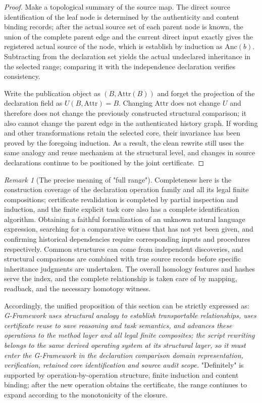 \documentclass[11pt,a4paper]{article}
\theoremstyle{plain}
\theoremstyle{definition}
\theoremstyle{remark}
\newtheorem{remark}[theorem]{Remark}
\begin{document}
\begin{CJK*}
\begin{proof}
Make a topological summary of the source map. The direct source identification of the leaf node is determined by the authenticity and content binding records; after the actual source set of each parent node is known, the union of the complete parent edge and the current direct input exactly gives the registered actual source of the node, which is establish by induction as $\mathrm{Anc}(b)$. Subtracting from the declaration set yields the actual undeclared inheritance in the selected range; comparing it with the independence declaration verifies consistency.

Write the publication object as $(B,\mathrm{Attr}(B))$ and forget the projection of the declaration field as $U(B,\mathrm{Attr})=B$. Changing $\mathrm{Attr}$ does not change $U$ and therefore does not change the previously constructed structural comparison; it also cannot change the parent edge in the authenticated history graph. If wording and other transformations retain the selected core, their invariance has been proved by the foregoing induction. As a result, the clean rewrite still uses the same analogy and reuse mechanism at the structural level, and changes in source declarations continue to be positioned by the joint certificate.\end{proof}


\begin{remark}
[The precise meaning of "full range"]Completeness here is the construction coverage of the declaration operation family and all its legal finite compositions; certificate revalidation is completed by partial inspection and induction, and the finite explicit task core also has a complete identification algorithm. Obtaining a faithful formalization of an unknown natural language expression, searching for a comparative witness that has not yet been given, and confirming historical dependencies require corresponding inputs and procedures respectively. Common structures can come from independent discoveries, and structural comparisons are combined with true source records before specific inheritance judgments are undertaken. The overall homology features and hashes serve the index, and the complete relationship is taken care of by mapping, readback, and the necessary homotopy witness.\end{remark}


Accordingly, the unified proposition of this section can be strictly expressed as: \emph { G-Framework uses structural analogy to establish transportable relationships, uses certificate reuse to save reasoning and task semantics, and advances these operations to the method layer and all legal finite composites; the script rewriting belongs to the same derived operating system at its structural layer, so it must enter the G-Framework in the declaration comparison domain representation, verification, retained core identification and source audit scope. } "Definitely" is supported by operation-by-operation structure, finite induction and content binding; after the new operation obtains the certificate, the range continues to expand according to the monotonicity of the closure.




\end{CJK*}
\end{document}
